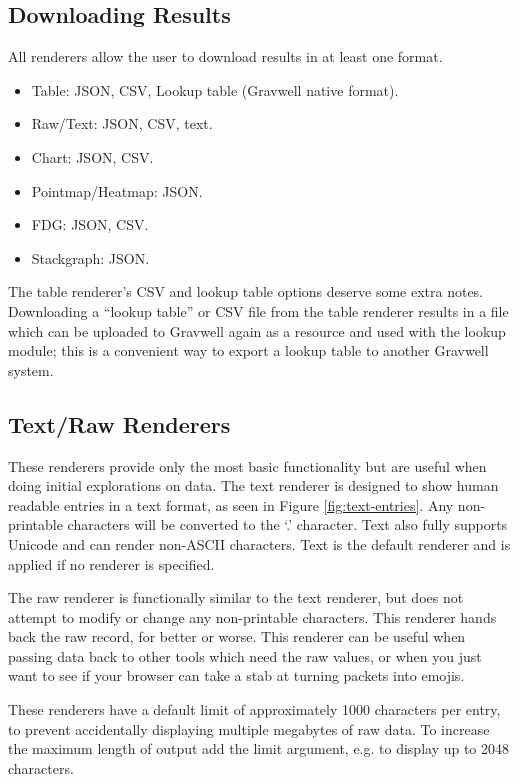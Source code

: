 \subsection{Downloading Results}
All renderers allow the user to download results in at least one
format.

\begin{itemize}
\item
  Table: JSON, CSV, Lookup table (Gravwell native format).
\item
  Raw/Text: JSON, CSV, text.
\item
  Chart: JSON, CSV.
\item
  Pointmap/Heatmap: JSON.
\item
  FDG: JSON, CSV.
\item
  Stackgraph: JSON.
\end{itemize}

The table renderer's CSV and lookup table options deserve some extra notes.
Downloading a ``lookup table'' or CSV file
from the table renderer results in a file which can be uploaded to
Gravwell again as a resource and used with the lookup module; this is a
convenient way to export a lookup table to another Gravwell system.


\subsection{Text/Raw Renderers}
These renderers provide only the most basic functionality but are
useful when doing initial explorations on data. The text renderer is
designed to show human readable entries in a text format, as seen in Figure \ref{fig:text-entries}. Any
non-printable characters will be converted to the `.' character. Text
also fully supports Unicode and can render non-ASCII characters. Text is
the default renderer and is applied if no renderer is specified.

The raw renderer is functionally similar to the text renderer, but does
not attempt to modify or change any non-printable characters. This
renderer hands back the raw record, for better or worse. This renderer
can be useful when passing data back to other tools which need the raw
values, or when you just want to see if your browser can take a stab at
turning packets into emojis.

These renderers have a default limit of approximately 1000 characters per
entry, to prevent accidentally displaying multiple megabytes of raw
data. To increase the maximum length of output add the limit argument, 
e.g.  to display up to 2048 characters.


